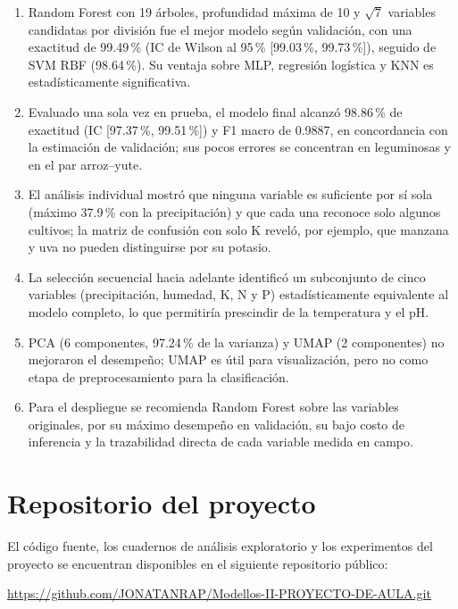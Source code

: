 \documentclass[conference]{IEEEtran}
\begin{document}
\begin{enumerate}
    \item Random Forest con 19 árboles, profundidad máxima de 10 y $\sqrt{7}$ variables candidatas por división fue el mejor modelo según validación, con una exactitud de 99.49\,\% (IC de Wilson al 95\,\% [99.03\,\%, 99.73\,\%]), seguido de SVM RBF (98.64\,\%). Su ventaja sobre MLP, regresión logística y KNN es estadísticamente significativa.
    \item Evaluado una sola vez en prueba, el modelo final alcanzó 98.86\,\% de exactitud (IC [97.37\,\%, 99.51\,\%]) y F1 macro de 0.9887, en concordancia con la estimación de validación; sus pocos errores se concentran en leguminosas y en el par arroz--yute.
    \item El análisis individual mostró que ninguna variable es suficiente por sí sola (máximo 37.9\,\% con la precipitación) y que cada una reconoce solo algunos cultivos; la matriz de confusión con solo K reveló, por ejemplo, que manzana y uva no pueden distinguirse por su potasio.
    \item La selección secuencial hacia adelante identificó un subconjunto de cinco variables (precipitación, humedad, K, N y P) estadísticamente equivalente al modelo completo, lo que permitiría prescindir de la temperatura y el pH.
    \item PCA (6 componentes, 97.24\,\% de la varianza) y UMAP (2 componentes) no mejoraron el desempeño; UMAP es útil para visualización, pero no como etapa de preprocesamiento para la clasificación.
    \item Para el despliegue se recomienda Random Forest sobre las variables originales, por su máximo desempeño en validación, su bajo costo de inferencia y la trazabilidad directa de cada variable medida en campo.
\end{enumerate}




\appendices
\section{Repositorio del proyecto}

El código fuente, los cuadernos de análisis exploratorio y los experimentos del proyecto se encuentran disponibles en el siguiente repositorio público:
\begin{center}
\url{https://github.com/JONATANRAP/Modellos-II-PROYECTO-DE-AULA.git}
\end{center}
\end{document}
